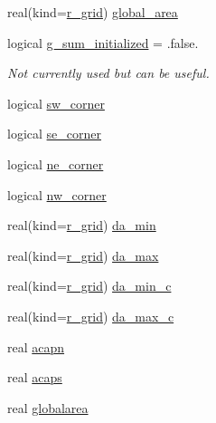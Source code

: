 \begin{DoxyCompactItemize}
\item 
real(kind=\hyperlink{classfv__arrays__mod_ab0ba8527d270f349a84fa0a330be1923}{r\-\_\-grid}) \hyperlink{structfv__arrays__mod_1_1fv__grid__type_aee36f5d061433ed3c25b33bd7f2db89e}{global\-\_\-area}
\item 
logical \hyperlink{structfv__arrays__mod_1_1fv__grid__type_a6b5cae2a38a6cb623370af93220f6c9b}{g\-\_\-sum\-\_\-initialized} = .false.
\begin{DoxyCompactList}\small\item\em Not currently used but can be useful. \end{DoxyCompactList}\item 
logical \hyperlink{structfv__arrays__mod_1_1fv__grid__type_ac26c9c95c9af5721294eaa01214d81bc}{sw\-\_\-corner}
\item 
logical \hyperlink{structfv__arrays__mod_1_1fv__grid__type_ab5b5bee5687310964c05b317f0741d83}{se\-\_\-corner}
\item 
logical \hyperlink{structfv__arrays__mod_1_1fv__grid__type_a09a7176413e053afee344bc0d4a4e8a7}{ne\-\_\-corner}
\item 
logical \hyperlink{structfv__arrays__mod_1_1fv__grid__type_a645d242712aa83d73d79ca632c8d8d82}{nw\-\_\-corner}
\item 
real(kind=\hyperlink{classfv__arrays__mod_ab0ba8527d270f349a84fa0a330be1923}{r\-\_\-grid}) \hyperlink{structfv__arrays__mod_1_1fv__grid__type_aed0d2c5ba32757c7e26ad825735aa034}{da\-\_\-min}
\item 
real(kind=\hyperlink{classfv__arrays__mod_ab0ba8527d270f349a84fa0a330be1923}{r\-\_\-grid}) \hyperlink{structfv__arrays__mod_1_1fv__grid__type_a811a33a354e8247dfe9ec8d6680d1ee5}{da\-\_\-max}
\item 
real(kind=\hyperlink{classfv__arrays__mod_ab0ba8527d270f349a84fa0a330be1923}{r\-\_\-grid}) \hyperlink{structfv__arrays__mod_1_1fv__grid__type_a3746caf9bc2ce63f5f5e3c4cdbb4542e}{da\-\_\-min\-\_\-c}
\item 
real(kind=\hyperlink{classfv__arrays__mod_ab0ba8527d270f349a84fa0a330be1923}{r\-\_\-grid}) \hyperlink{structfv__arrays__mod_1_1fv__grid__type_a644faaccddb36bfd3be811a65d2ef3c0}{da\-\_\-max\-\_\-c}
\item 
real \hyperlink{structfv__arrays__mod_1_1fv__grid__type_afe9680f64549405027e05ecfe1182922}{acapn}
\item 
real \hyperlink{structfv__arrays__mod_1_1fv__grid__type_adb3b9b755800023ce578f3dc74602f44}{acaps}
\item 
real \hyperlink{structfv__arrays__mod_1_1fv__grid__type_a383deb175e4a761c10e8f9d09817146a}{globalarea}

\end{DoxyCompactItemize}
